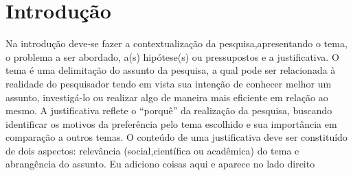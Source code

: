 \chapter[Introdução]{Introdução}

Na introdução deve-se fazer a contextualização da pesquisa,apresentando o tema, o problema a ser abordado, a(s) hipótese(s) ou pressupostos e a justificativa. O tema é uma delimitação do assunto da pesquisa, a qual pode ser relacionada à realidade do pesquisador tendo em vista sua intenção de conhecer melhor um assunto, investigá-lo ou realizar algo de maneira mais eficiente em relação ao mesmo. A justificativa reflete o “porquê” da realização da pesquisa, buscando identificar os motivos da preferência pelo tema escolhido e sua importância em comparação a outros temas. O conteúdo de uma justificativa deve ser constituído de dois aspectos: relevância (social,científica ou acadêmica) do tema e abrangência do assunto. Eu adiciono coisas aqui e aparece no lado direito
